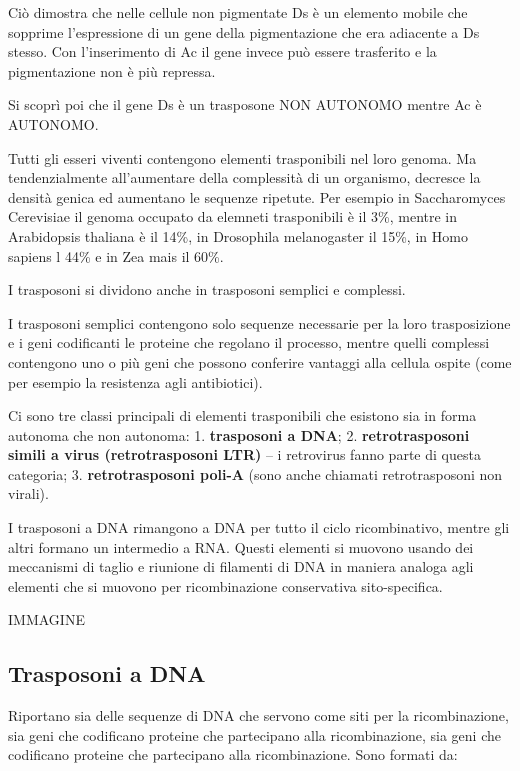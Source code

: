 \documentclass[]{article}
\begin{document}
Ciò dimostra che nelle cellule non pigmentate Ds è un elemento mobile
che sopprime l'espressione di un gene della pigmentazione che era
adiacente a Ds stesso. Con l'inserimento di Ac il gene invece può essere
trasferito e la pigmentazione non è più repressa.

Si scoprì poi che il gene Ds è un trasposone NON AUTONOMO mentre Ac è
AUTONOMO.

Tutti gli esseri viventi contengono elementi trasponibili nel loro
genoma. Ma tendenzialmente all'aumentare della complessità di un
organismo, decresce la densità genica ed aumentano le sequenze ripetute.
Per esempio in Saccharomyces Cerevisiae il genoma occupato da elemneti
trasponibili è il 3\%, mentre in Arabidopsis thaliana è il 14\%, in
Drosophila melanogaster il 15\%, in Homo sapiens l 44\% e in Zea mais il
60\%.

I trasposoni si dividono anche in trasposoni semplici e complessi.

I trasposoni semplici contengono solo sequenze necessarie per la loro
trasposizione e i geni codificanti le proteine che regolano il processo,
mentre quelli complessi contengono uno o più geni che possono conferire
vantaggi alla cellula ospite (come per esempio la resistenza agli
antibiotici).

Ci sono tre classi principali di elementi trasponibili che esistono sia
in forma autonoma che non autonoma: 1. \textbf{trasposoni a DNA}; 2.
\textbf{retrotrasposoni simili a virus (retrotrasposoni LTR)} -- i
retrovirus fanno parte di questa categoria; 3. \textbf{retrotrasposoni
poli-A} (sono anche chiamati retrotrasposoni non virali).

I trasposoni a DNA rimangono a DNA per tutto il ciclo ricombinativo,
mentre gli altri formano un intermedio a RNA. Questi elementi si muovono
usando dei meccanismi di taglio e riunione di filamenti di DNA in
maniera analoga agli elementi che si muovono per ricombinazione
conservativa sito-specifica.

IMMAGINE

\subsection{Trasposoni a DNA}\label{trasposoni-a-dna}

Riportano sia delle sequenze di DNA che servono come siti per la
ricombinazione, sia geni che codificano proteine che partecipano alla
ricombinazione, sia geni che codificano proteine che partecipano alla
ricombinazione. Sono formati da:
\end{document}
